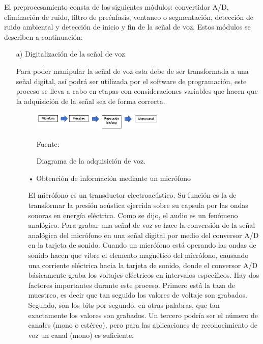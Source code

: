 El preprocesamiento consta de los siguientes módulos: convertidor A/D, eliminación de ruido, filtro de preénfasis, ventaneo o segmentación, detección de ruido ambiental y detección de inicio y fin de la señal de voz. Estos módulos se describen a continuación:

\begin{enumerate}
\item[a)]Digitalización de la señal de voz
\par
Para poder manipular la señal de voz esta debe de ser transformada a una señal digital, así podrá ser utilizada por el software de programación, este proceso se lleva a cabo en etapas con consideraciones variables que hacen que la adquisición de la señal sea de forma correcta.

\newpage
\begin{figure}[ht]
\begin{center}
\includegraphics[width=0.6\textwidth]{Imagenes/Cap2/image008}
\end{center}
\begin{center}
\vskip -0.5cm
\caption{\small{Diagrama de la adquisición de voz.}}
\label{fig:figura2.8}
{\small{Fuente: \cite{eyra}}}
\end{center}
\end{figure}

\begin{enumerate}
\item[•]Obtención de información mediante un micrófono
\par
El micrófono es un transductor electroacústico. Su función es la de transformar la presión acústica ejercida sobre su capsula por las ondas sonoras en energía eléctrica.
\vskip 0.5cm
Como se dijo, el audio es un fenómeno analógico. Para grabar una señal de voz se hace la conversión de la señal analógica del micrófono en una señal digital por medio del conversor A/D en la tarjeta de sonido. Cuando un micrófono está operando las ondas de sonido hacen que vibre el elemento magnético del micrófono, causando una corriente eléctrica hacia la tarjeta de sonido, donde el conversor A/D básicamente graba los voltajes eléctricos en intervalos específicos.
\vskip 0.5cm
Hay dos factores importantes durante este proceso. Primero está la taza de muestreo, es decir que tan seguido los valores de voltaje son grabados. Segundo, son los bits por segundo, en otras palabras, que tan exactamente los valores son grabados. Un tercero podría ser el número de canales (mono o estéreo), pero para las aplicaciones de reconocimiento de voz un canal (mono) es suficiente.


\end{enumerate}
\end{enumerate}
